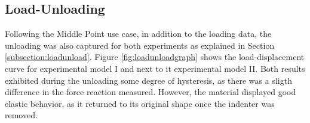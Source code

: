 \subsection{Load-Unloading}
\label{subsection:loadunloadresult}
Following the Middle Point use case, in addition to the loading data, the unloading was 
also captured for both experiments as explained in Section \ref{subsection:loadunload}.
Figure \ref{fig:loadunloadgraph} shows the load-displacement curve for experimental model 
I and next to it experimental model II. Both results exhibited during the unloading some 
degree of hysteresis, as there was a sligth difference in the force reaction measured.
However, the material displayed good elastic behavior, as it returned to its 
original shape once the indenter was removed.\\

